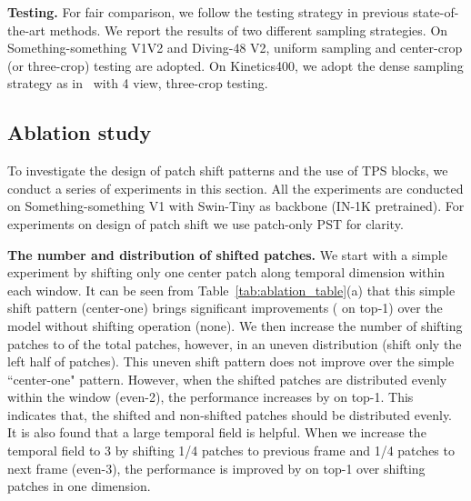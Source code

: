 \documentclass[runningheads]{llncs}
\begin{document}
	\textbf{Testing.} For fair comparison, we follow the testing strategy in previous state-of-the-art methods. We report the results of two different sampling strategies. On Something-something V1V2 and Diving-48 V2, uniform sampling and center-crop (or three-crop) testing are adopted. On Kinetics400, we adopt the dense sampling strategy as in~\cite{AnuragArnab2021ViViTAV} with 4 view, three-crop testing.
	
	\subsection{Ablation study}
	
	To investigate the design of patch shift patterns and the use of TPS blocks, we conduct a series of experiments in this section. All the experiments are conducted on Something-something V1 with Swin-Tiny as backbone (IN-1K pretrained). For experiments on design of patch shift we use patch-only PST for clarity. 
	
	\textbf{The number and distribution of shifted patches.}	We start with a simple experiment by shifting only one center patch along temporal dimension within each window. It can be seen from Table~\ref{tab:ablation_table}(a) that this simple shift pattern (center-one) brings significant improvements ( on top-1) over the model without shifting operation (none). We then increase the number of shifting patches to  of the total patches, however, in an uneven distribution (shift only the left half of patches). This uneven shift pattern does not improve over the simple ``center-one" pattern. However, when the shifted patches are distributed evenly within the window (even-2), the performance increases by  on top-1. This indicates that, the shifted and non-shifted patches should be distributed evenly. It is also found that a large temporal field is helpful. When we increase the temporal field to 3 by shifting 1/4 patches to previous frame and 1/4 patches to next frame (even-3), the performance is improved by  on top-1 over shifting patches in one dimension.
	
\end{document}

